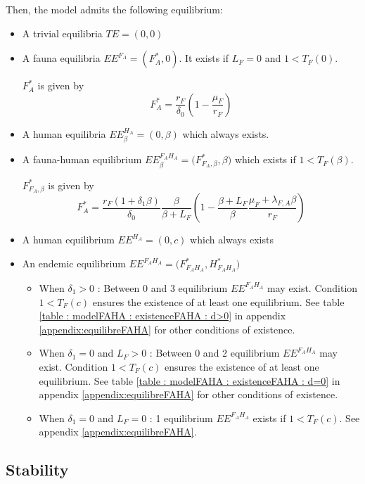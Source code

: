\documentclass{article}
\newcommand{\lfa}{\lambda_{F, A}}
\begin{document}
Then, the model admits the following equilibrium:
\begin{itemize}
\item A trivial equilibria $TE= (0,0)$
\item A fauna equilibria $EE^{F_A} = (F_A^*, 0)$. It exists if $L_F = 0$ and $1 < T_F(0)$.

$F_A^*$ is given by
\begin{equation*}
F_A^* = \dfrac{r_F}{\delta_0}\left(1 - \dfrac{\mu_F }{r_F} \right)
\end{equation*}

\item A human equilibria $EE^{H_A}_\beta = (0, \beta)$ which always exists.
\item A fauna-human equilibrium $EE^{F_AH_A}_\beta = \Big(F^*_{F_A, \beta}, \beta\Big)$ which exists if $1 < T_F(\beta)$.

$F^*_{F_A, \beta}$ is given by
\begin{equation*}
F_A^* = \dfrac{r_F(1+\delta_1 \beta)}{\delta_0}\dfrac{\beta}{\beta + L_F}\left(1 - \dfrac{\beta + L_F}{\beta}\dfrac{\mu_F+ \lfa \beta}{r_F} \right)
\end{equation*}

\item A human equilibrium $EE^{H_A} = (0, c)$ which always exists


\item An endemic equilibrium $EE^{F_AH_A} = \Big(F^*_{F_AH_A}, H^*_{F_AH_A}\Big)$
\begin{itemize}
\item When $\delta_1 > 0$ : Between 0 and 3 equilibrium $EE^{F_AH_A}$ may exist. Condition $1 < T_F(c)$ ensures the existence of at least one equilibrium. See table \ref{table : modelFAHA : existenceFAHA : d>0} in appendix \ref{appendix:equilibreFAHA} for other conditions of existence.
\item When $\delta_1 = 0$ and $L_F > 0$ : Between 0 and 2 equilibrium $EE^{F_AH_A}$ may exist. Condition $1 < T_F(c)$ ensures the existence of at least one equilibrium. See table \ref{table : modelFAHA : existenceFAHA : d=0} in appendix \ref{appendix:equilibreFAHA} for other conditions of existence.
\item When $\delta_1 = 0$ and $L_F = 0$ : 1 equilibrium $EE^{F_AH_A}$ exists if $1 < T_F(c)$. See appendix \ref{appendix:equilibreFAHA}.
\end{itemize}
\end{itemize}


\subsection{Stability}
\end{document}
